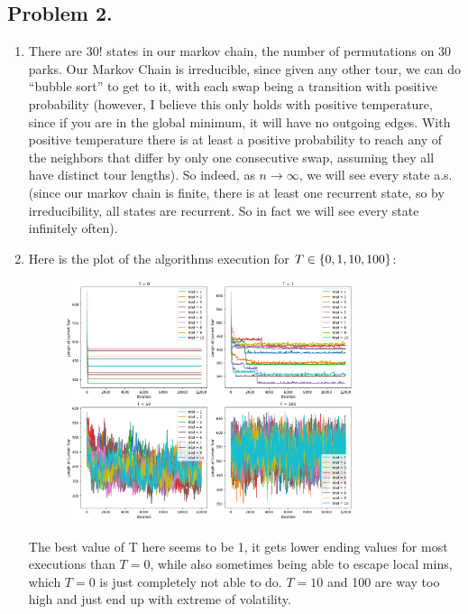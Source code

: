 \documentclass[12pt]{article}
\newcommand{\SET}[1]{\Set{\mskip-\medmuskip #1 \mskip-\medmuskip}}
\begin{document}
    \subsection*{Problem 2.}
    \begin{enumerate}[label=(\alph*)]
        \item There are $30!$ states in our markov chain, the number of permutations on 30 parks. Our Markov Chain is irreducible, since given any other tour, we can do ``bubble sort'' to get to it, with each swap being a transition with positive probability (however, I believe this only holds with positive temperature, since if you are in the global minimum, it will have no outgoing edges. With positive temperature there is at least a positive probability to reach any of the neighbors that differ by only one consecutive swap, assuming they all have distinct tour lengths). So indeed, as $n \to \infty$, we will see every state a.s. (since our markov chain is finite, there is at least one recurrent state, so by irreducibility, all states are recurrent. So in fact we will see every state infinitely often).

        \item Here is the plot of the algorithms execution for $T \in \SET{0, 1, 10, 100}$:
        \begin{figure}[H]
            \centering
            \includegraphics[width=0.8\textwidth]{alg.png}
        \end{figure}
        The best value of T here seems to be 1, it gets lower ending values for most executions than $T = 0$, while also sometimes being able to escape local mins, which $T = 0$ is just completely not able to do. $T = 10$ and 100 are way too high and just end up with extreme of volatility. 


\end{enumerate}
\end{document}
